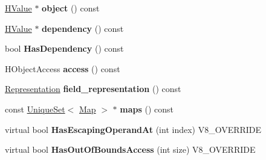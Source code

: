 \begin{DoxyCompactItemize}
\item 
\hypertarget{classv8_1_1internal_1_1_v8___f_i_n_a_l_a5cf72ed4b954f3413a0aa63069a75283}{}\hyperlink{classv8_1_1internal_1_1_h_value}{H\+Value} $\ast$ {\bfseries object} () const \label{classv8_1_1internal_1_1_v8___f_i_n_a_l_a5cf72ed4b954f3413a0aa63069a75283}

\item 
\hypertarget{classv8_1_1internal_1_1_v8___f_i_n_a_l_a2dc4fa79ff1b05f63414663e54be99fd}{}\hyperlink{classv8_1_1internal_1_1_h_value}{H\+Value} $\ast$ {\bfseries dependency} () const \label{classv8_1_1internal_1_1_v8___f_i_n_a_l_a2dc4fa79ff1b05f63414663e54be99fd}

\item 
\hypertarget{classv8_1_1internal_1_1_v8___f_i_n_a_l_afa85f10e0771e676cbc3526f47ab6855}{}bool {\bfseries Has\+Dependency} () const \label{classv8_1_1internal_1_1_v8___f_i_n_a_l_afa85f10e0771e676cbc3526f47ab6855}

\item 
\hypertarget{classv8_1_1internal_1_1_v8___f_i_n_a_l_ab03dc0adb68e3ab7f30fc3362803f523}{}H\+Object\+Access {\bfseries access} () const \label{classv8_1_1internal_1_1_v8___f_i_n_a_l_ab03dc0adb68e3ab7f30fc3362803f523}

\item 
\hypertarget{classv8_1_1internal_1_1_v8___f_i_n_a_l_a08304cdf7117d69b0cf7827fbc46b733}{}\hyperlink{classv8_1_1internal_1_1_representation}{Representation} {\bfseries field\+\_\+representation} () const \label{classv8_1_1internal_1_1_v8___f_i_n_a_l_a08304cdf7117d69b0cf7827fbc46b733}

\item 
\hypertarget{classv8_1_1internal_1_1_v8___f_i_n_a_l_a21bbb06ce228900cf75370413e3db40c}{}const \hyperlink{classv8_1_1internal_1_1_unique_set}{Unique\+Set}$<$ \hyperlink{classv8_1_1internal_1_1_map}{Map} $>$ $\ast$ {\bfseries maps} () const \label{classv8_1_1internal_1_1_v8___f_i_n_a_l_a21bbb06ce228900cf75370413e3db40c}

\item 
\hypertarget{classv8_1_1internal_1_1_v8___f_i_n_a_l_ae559b1a39de93c2925ab5815da490738}{}virtual bool {\bfseries Has\+Escaping\+Operand\+At} (int index) V8\+\_\+\+O\+V\+E\+R\+R\+I\+D\+E\label{classv8_1_1internal_1_1_v8___f_i_n_a_l_ae559b1a39de93c2925ab5815da490738}

\item 
\hypertarget{classv8_1_1internal_1_1_v8___f_i_n_a_l_a739f7cc8aef8467db65a9d9989fb5e4f}{}virtual bool {\bfseries Has\+Out\+Of\+Bounds\+Access} (int size) V8\+\_\+\+O\+V\+E\+R\+R\+I\+D\+E\label{classv8_1_1internal_1_1_v8___f_i_n_a_l_a739f7cc8aef8467db65a9d9989fb5e4f}


\end{DoxyCompactItemize}
